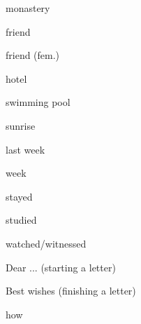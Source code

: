 \documentclass[avery5371,grid,frame]{flashcards}
\begin{document}
\begin{flashcard}{\LARGE monastery}
\LARGE {}
\end{flashcard}
\begin{flashcard}{\LARGE friend}
\LARGE {}
\end{flashcard}
\begin{flashcard}{\LARGE friend (fem.)}
\LARGE {}
\end{flashcard}
\begin{flashcard}{\LARGE hotel}
\LARGE {}
\end{flashcard}
\begin{flashcard}{\LARGE swimming pool}
\LARGE {}
\end{flashcard}
\begin{flashcard}{\LARGE sunrise}
\LARGE {}
\end{flashcard}
\begin{flashcard}{\LARGE last week}
\LARGE {}
\end{flashcard}
\begin{flashcard}{\LARGE week}
\LARGE {}
\end{flashcard}
\begin{flashcard}{\LARGE stayed}
\LARGE {}
\end{flashcard}
\begin{flashcard}{\LARGE studied}
\LARGE {}
\end{flashcard}
\begin{flashcard}{\LARGE watched/witnessed}
\LARGE {}
\end{flashcard}
\begin{flashcard}{\LARGE Dear ... (starting a letter)}
\LARGE {}
\end{flashcard}
\begin{flashcard}{\LARGE Best wishes (finishing a letter)}
\LARGE {}
\end{flashcard}
\begin{flashcard}{\LARGE how}
\LARGE {}
\end{flashcard}
\end{document}
